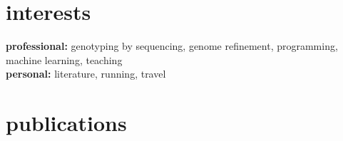 \documentclass[]{friggeri-cv} %
\begin{document}

\section{interests}

\textbf{professional:} genotyping by sequencing, genome refinement, programming, machine learning, teaching \\ \textbf{personal:} literature, running, travel


\section{publications}

\cite{greshake2014opensnp}
\cite{mason2014high}
\cite{lai2015identification}
\cite{dattolo2013acclimation}
\cite{chalhoub2014early}
\cite{golicz2015skim}
\cite{bayer2015high}
\cite{bayer2016skim}
\cite{mason2016centromere}
\cite{visendi2016efficient}
\cite{bayer2016genomics}
\cite{lee2016genome}
\cite{barash2016candidate}
\cite{hane2017comprehensive}
\cite{golicz2016pangenome}
\cite{gacek2016genome}
\cite{kaur2017advanced}
\cite{montenegro2017pangenome}
\cite{yuan2017improvements}
\cite{bayer2017assembly}




\end{document}
